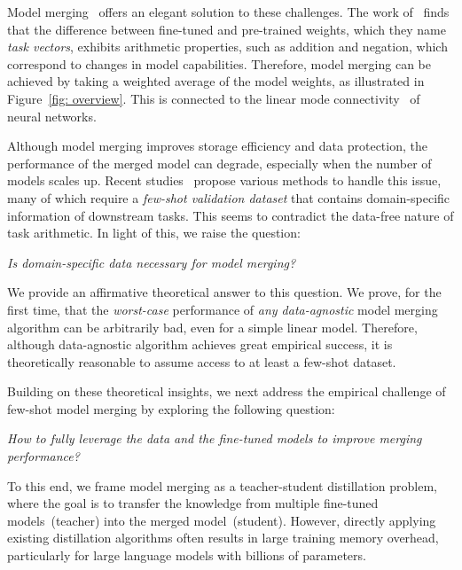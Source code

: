 Model merging~\citep{yang2024model,goddard2024arcee,tang2024fusionbench} offers an elegant solution to these challenges. The work of~\citet{ilharco2022editing} finds that the difference between fine-tuned and pre-trained weights, which they name \textit{task vectors}, exhibits arithmetic properties, such as addition and negation, which correspond to changes in model capabilities. Therefore, model merging can be achieved by taking a weighted average of the model weights, as illustrated in Figure~\ref{fig: overview}. This is connected to the linear mode connectivity~\citep{frankle2020linear,mirzadeh2020linear} of neural networks.



Although model merging improves storage efficiency and data protection, the performance of the merged model can degrade, especially when the number of models scales up. Recent studies~\citep{matena2022merging, jin2022dataless,yang2023adamerging} propose various methods to handle this issue,
many of which require a \textit{few-shot validation dataset} that contains domain-specific information of downstream tasks.
This seems to contradict the data-free nature of task arithmetic. In light of this, we raise the question:
\begin{introbox}
\begin{center}
   \textit{Is domain-specific data necessary for model merging?} 
\end{center}
\end{introbox}


We provide an affirmative theoretical answer to this question. We prove, for the first time, that the \textit{worst-case} performance of \textit{any data-agnostic} model merging algorithm can be arbitrarily bad, even for a simple linear model. Therefore, although data-agnostic algorithm achieves great empirical success, it is theoretically reasonable to assume access to at least a few-shot dataset. 

Building on these theoretical insights, we next address the empirical challenge of few-shot model merging by exploring the following question:
\begin{introbox}
\begin{center}
   \textit{How to fully leverage the data and the fine-tuned models to improve merging performance?} 
\end{center}
\end{introbox}

To this end, we frame model merging as a teacher-student distillation problem, where the goal is to transfer the knowledge from multiple fine-tuned models~(teacher) into the merged model~(student). However, directly applying existing distillation algorithms often results in large training memory overhead, particularly for large language models with billions of parameters.





